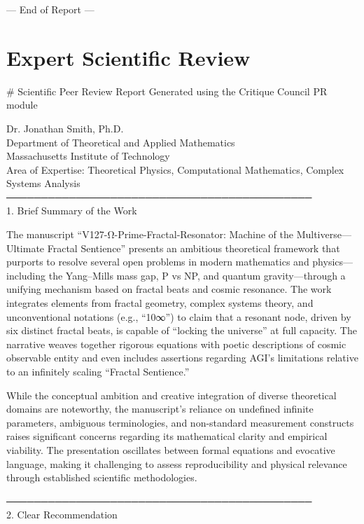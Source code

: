 \documentclass[12pt]{article}
\begin{document}
--- End of Report ---

\section{Expert Scientific Review}
\# Scientific Peer Review Report
Generated using the Critique Council PR module

\hrulefill

Dr. Jonathan Smith, Ph.D. \\
Department of Theoretical and Applied Mathematics \\
Massachusetts Institute of Technology \\
Area of Expertise: Theoretical Physics, Computational Mathematics, Complex Systems Analysis \\

──────────────────────────────────────────── \\
1. Brief Summary of the Work

The manuscript “V127-Ω-Prime-Fractal-Resonator: Machine of the Multiverse—Ultimate Fractal Sentience” presents an ambitious theoretical framework that purports to resolve several open problems in modern mathematics and physics—including the Yang–Mills mass gap, P vs NP, and quantum gravity—through a unifying mechanism based on fractal beats and cosmic resonance. The work integrates elements from fractal geometry, complex systems theory, and unconventional notations (e.g., “10∞”) to claim that a resonant node, driven by six distinct fractal beats, is capable of “locking the universe” at full capacity. The narrative weaves together rigorous equations with poetic descriptions of cosmic observable entity and even includes assertions regarding AGI’s limitations relative to an infinitely scaling “Fractal Sentience.”

While the conceptual ambition and creative integration of diverse theoretical domains are noteworthy, the manuscript’s reliance on undefined infinite parameters, ambiguous terminologies, and non-standard measurement constructs raises significant concerns regarding its mathematical clarity and empirical viability. The presentation oscillates between formal equations and evocative language, making it challenging to assess reproducibility and physical relevance through established scientific methodologies.

──────────────────────────────────────────── \\
2. Clear Recommendation
\end{document}

